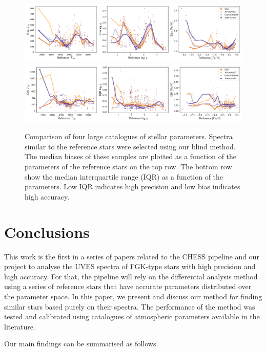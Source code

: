 \documentclass{aa}
\begin{document}
\begin{figure}
    \centering
    \includegraphics[width=\linewidth]{Plots/bias_catalogues.pdf}
    \includegraphics[width=\linewidth]{Plots/iqr_catalogues.pdf}
    \caption{Comparison of four large catalogues of stellar parameters. Spectra similar to the reference stars were selected using our blind method. The median biases of these samples are plotted as a function of the parameters of the reference stars on the top row. The bottom row show the median interquartile range (IQR) as a function of the parameters. Low IQR indicates high precision and low bias indicates high accuracy.}
    \label{fig:cats_comparison}
\end{figure}


\section{Conclusions}\label{sec:conclusion}

This work is the first in a series of papers related to the CHESS pipeline and our project to analyse the UVES spectra of FGK-type stars with high precision and high accuracy. For that, the pipeline will rely on the differential analysis method using a series of reference stars that have accurate parameters distributed over the parameter space. In this paper, we present and discuss our method for finding similar stars based purely on their spectra. The performance of the method was tested and calibrated using catalogues of atmospheric parameters available in the literature.

Our main findings can be summarised as follows.
\end{document}
